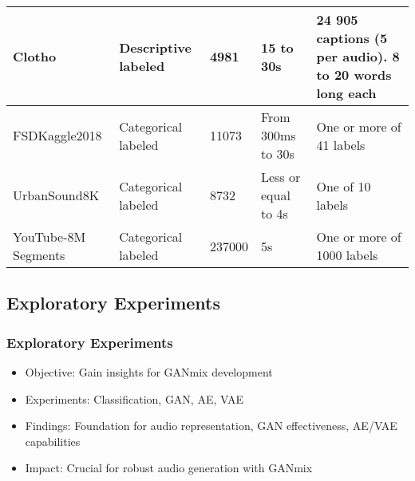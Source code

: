 \begin{frame}
\begin{table}[ht]
\begin{tabularx}{\textwidth}{|X|X|X|X|X|}
            Clotho \cite{drossos_clotho_2019}                       &
            Descriptive labeled                                     &
            4981                                                    &
            15 to 30s                                               &
            24 905 captions (5 per audio). 8 to 20 words long each    \\ \hline

            FSDKaggle2018 \cite{fonseca_general-purpose_2018}       &
            Categorical labeled                                     &
            11073                                                   &
            From 300ms to 30s                                       &
            One or more of 41 labels                                  \\ \hline

            UrbanSound8K \cite{salamon_dataset_2014}                &
            Categorical labeled                                     &
            8732                                                    &
            Less or equal to 4s                                     &
            One of 10 labels                                          \\ \hline

            YouTube-8M Segments \cite{abu-el-haija_youtube-8m_2016} &
            Categorical labeled                                     &
            237000                                                  &
            5s                                                      &
            One or more of 1000 labels                                \\ \hline
        \end{tabularx}
    \end{table}
\end{frame}


\subsection{Exploratory Experiments}

\begin{frame}
    \frametitle{Exploratory Experiments}
    
    \begin{itemize}
        \item Objective: Gain insights for GANmix development
        \item Experiments: Classification, GAN, AE, VAE
        \item Findings: Foundation for audio representation, GAN effectiveness, AE/VAE capabilities
        \item Impact: Crucial for robust audio generation with GANmix
    \end{itemize}

\end{frame}

